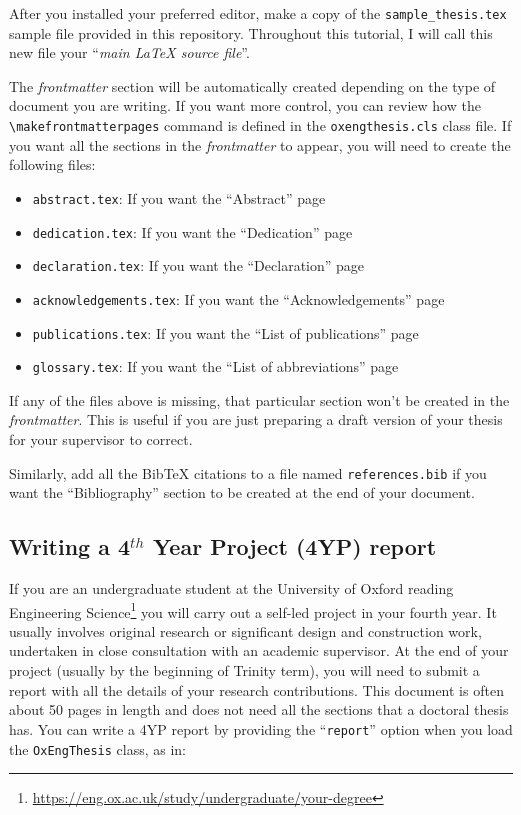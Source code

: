 After you installed your preferred \latex editor, make a copy of the \verb|sample_thesis.tex| sample file provided in this repository. Throughout this tutorial, I will call this new file your ``\textit{main LaTeX source file}''.

The \textit{frontmatter} section will be automatically created depending on the type of document you are writing. If you want more control, you can review how the \verb|\makefrontmatterpages| command is defined in the \verb|oxengthesis.cls| class file. If you want all the sections in the \textit{frontmatter} to appear, you will need to create the following files:

\begin{itemize}
    \item \verb|abstract.tex|: If you want the ``Abstract'' page
    \item \verb|dedication.tex|: If you want the ``Dedication'' page
    \item \verb|declaration.tex|: If you want the ``Declaration'' page
    \item \verb|acknowledgements.tex|: If you want the ``Acknowledgements'' page
    \item \verb|publications.tex|: If you want the ``List of publications'' page
    \item \verb|glossary.tex|: If you want the ``List of abbreviations'' page
\end{itemize}

If any of the files above is missing, that particular section won't be created in the \textit{frontmatter}. This is useful if you are just preparing a draft version of your thesis for your supervisor to correct. 

Similarly, add all the BibTeX citations to a file named \verb|references.bib| if you want the ``Bibliography'' section to be created at the end of your document. 


\subsection{Writing a 4$^{th}$ Year Project (4YP) report}


If you are an undergraduate student at the University of Oxford reading Engineering Science\footnote{\url{https://eng.ox.ac.uk/study/undergraduate/your-degree}} you will carry out a self-led project in your fourth year. It usually involves original research or significant design and construction work, undertaken in close consultation with an academic supervisor. At the end of your project (usually by the beginning of Trinity term), you will need to submit a report with all the details of your research contributions. This document is often about 50 pages in length and does not need all the sections that a doctoral thesis has. You can write a 4YP report by providing the ``\verb|report|'' option when you load the \verb|OxEngThesis| class, as in:


